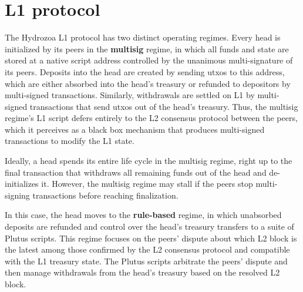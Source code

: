 \documentclass[../hydrozoa.tex]{subfiles}
\begin{document}
\chapter{L1 protocol}%
\label{h:l1-protocol}

The Hydrozoa L1 protocol has two distinct operating regimes.
Every head is initialized by its peers in the \textbf{multisig} regime, in which all funds and state are stored at a native script address controlled by the unanimous multi-signature of its peers.
Deposits into the head are created by sending utxos to this address, which are either absorbed into the head's treasury or refunded to depositors by multi-signed transactions.
Similarly, withdrawals are settled on L1 by multi-signed transactions that send utxos out of the head's treasury.
Thus, the multisig regime's L1 script defers entirely to the L2 consensus protocol between the peers, which it perceives as a black box mechanism that produces multi-signed transactions to modify the L1 state.

Ideally, a head spends its entire life cycle in the multisig regime, right up to the final transaction that withdraws all remaining funds out of the head and de-initializes it.
However, the multisig regime may stall if the peers stop multi-signing transactions before reaching finalization.

In this case, the head moves to the \textbf{rule-based} regime, in which unabsorbed deposits are refunded and control over the head's treasury transfers to a suite of Plutus scripts. 
This regime focuses on the peers' dispute about which L2 block is the latest among those confirmed by the L2 consensus protocol and compatible with the L1 treasury state.
The Plutus scripts arbitrate the peers' dispute and then manage withdrawals from the head's treasury based on the resolved L2 block.
\end{document}
